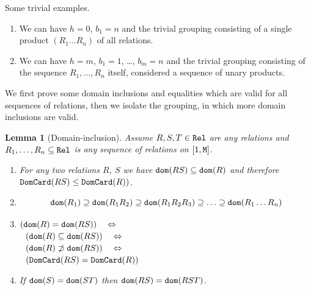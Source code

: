\documentclass{lmcs}
\newtheorem{lemma}[theorem]{Lemma}
\begin{document}
Some trivial examples. 
\begin{enumerate}
\item
We can have $h=0$, $b_1=n$ and the trivial grouping consisting of a single product  
$(R_1 \ldots R_n)$ of all relations. 
\item
We can have $h=m$, $b_1=1$, \ldots, $b_m=n$ and the trivial grouping consisting of the 
sequence $R_1, \ldots, R_n$ itself, considered a sequence of unary products.
\end{enumerate}

We first prove some domain inclusions and equalities 
which are valid for all sequences of relations, then we isolate the 
grouping, in which more domain inclusions are valid. 

\begin{lemma}[Domain-inclusion]
\label{lemma-domain-inclusion}
Assume $R, S, T \in {\tt Rel}$ are any relations and $R_1, \ldots, R_n \subseteq {\tt Rel}$
is any sequence of relations on $[1,{\tt M}]$.
\begin{enumerate}

\item
\label{lemma-domain-inclusion-01}
For any two relations $R$, $S$ we have ${\tt dom}(RS) \subseteq {\tt dom}(R)$
and therefore ${\tt DomCard}(RS) \le {\tt DomCard}(R))$.

\item
\label{lemma-domain-inclusion-02}

$$
{\tt dom}(R_1) \supseteq 
{\tt dom}(R_1 R_2) \supseteq 
{\tt dom}(R_1 R_2 R_3) \supseteq 
\ldots \supseteq 
{\tt dom}(R_1 \ldots R_n)
$$

\item
\label{lemma-domain-inclusion-03}
$
({\tt dom}(R) = {\tt dom}(RS))  
\ \ \  \Leftrightarrow \ \ \ 
$
\\
$
\ \ ({\tt dom}(R) \subseteq {\tt dom}(RS)) 
\ \ \  \Leftrightarrow \ \ \ 
$
\\
$ 
\ \ ({\tt dom}(R) \not \supset  {\tt dom}(RS))
\ \ \  \Leftrightarrow \ \ \ 
$
\\
$
\ \ ({\tt DomCard}(RS) = {\tt DomCard}(R))
$

\item
\label{lemma-domain-inclusion-04}
If ${\tt dom}(S) = {\tt dom}(ST)$ then 
${\tt dom}(RS) = {\tt dom}(RST)$.

\end{enumerate}
\end{lemma}
\end{document}
